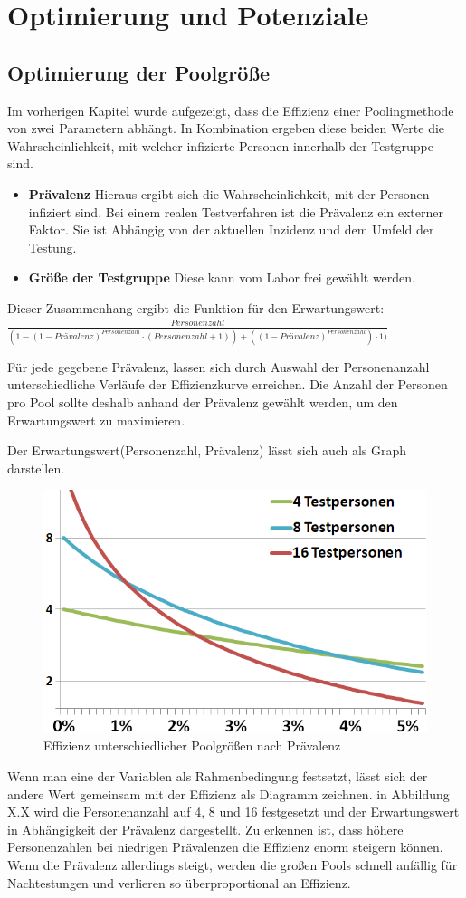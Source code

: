 \chapter{Optimierung und Potenziale}
\section{Optimierung der Poolgröße}
Im vorherigen Kapitel wurde aufgezeigt, dass die Effizienz einer Poolingmethode von zwei Parametern abhängt.
In Kombination ergeben diese beiden Werte die Wahrscheinlichkeit, mit welcher infizierte Personen innerhalb der Testgruppe sind.
\begin{itemize}
	\item \textbf{Prävalenz} Hieraus ergibt sich die Wahrscheinlichkeit, mit der Personen infiziert sind.
	Bei einem realen Testverfahren ist die Prävalenz ein externer Faktor.
	Sie ist Abhängig von der aktuellen Inzidenz und dem Umfeld der Testung.
	\item \textbf{Größe der Testgruppe} Diese kann vom Labor frei gewählt werden.
\end{itemize}

Dieser Zusammenhang ergibt die Funktion für den Erwartungswert:\newline
$\frac{Personenzahl}{(1 - (1-Prävalenz)^{Personenzahl} \cdot (Personenzahl + 1)) + ((1-Prävalenz)^{Personenzahl}) \cdot 1)}$

Für jede gegebene Prävalenz, lassen sich durch Auswahl der Personenanzahl unterschiedliche Verläufe der Effizienzkurve erreichen.
Die Anzahl der Personen pro Pool sollte deshalb anhand der Prävalenz gewählt werden, um den Erwartungswert zu maximieren.

Der Erwartungswert(Personenzahl, Prävalenz) lässt sich auch als Graph darstellen.
\begin{figure}
	\includegraphics[width=.48\textwidth]{img/PraevalenzZuTestgruppe}
	\caption{Effizienz unterschiedlicher \newline Poolgrößen nach Prävalenz}
\end{figure}
Wenn man eine der Variablen als Rahmenbedingung festsetzt, lässt sich der andere Wert gemeinsam mit der Effizienz als Diagramm zeichnen.
in Abbildung X.X wird die Personenanzahl auf 4, 8 und 16 festgesetzt und der Erwartungswert in Abhängigkeit der Prävalenz dargestellt.
Zu erkennen ist, dass höhere Personenzahlen bei niedrigen Prävalenzen die Effizienz enorm steigern können.
Wenn die Prävalenz allerdings steigt, werden die großen Pools schnell anfällig für Nachtestungen und verlieren so überproportional an Effizienz.

